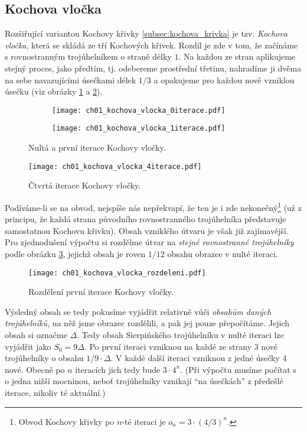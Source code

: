 \subsection{Kochova vločka}\label{subsec:kochova_vlocka}
Rozšiřující variantou Kochovy křivky \ref{subsec:kochova_krivka} je tzv. \emph{Kochova vločka}, která se skládá ze tří Kochových křivek. Rozdíl je zde v tom, že začínáme s rovnostranným trojúhelníkem o straně délky $1$. Na každou ze stran aplikujeme stejný proces, jako předtím, tj. odebereme prostřední třetinu, nahradíme ji dvěma na sebe navazujícími úsečkami délek $1/3$ a opakujeme pro každou nově vzniklou úsečku (viz obrázky \ref{fig:kochova_vlocka_dve_iterace} a \ref{fig:kochova_krivka_5iterace}).
\begin{figure}[h]
    \centering
    \begin{subfigure}{\subfigwidth}
        \centering
        \texttt{[image: ch01\_kochova\_vlocka\_0iterace.pdf]}
    \end{subfigure}
    \qquad
    \begin{subfigure}{\subfigwidth}
        \centering
        \texttt{[image: ch01\_kochova\_vlocka\_1iterace.pdf]}
    \end{subfigure}
    \caption{Nultá a první iterace Kochovy vločky.}
    \label{fig:kochova_vlocka_dve_iterace}
\end{figure}
\begin{figure}[h]
    \centering
    \texttt{[image: ch01\_kochova\_vlocka\_4iterace.pdf]}
    \caption{Čtvrtá iterace Kochovy vločky.}
    \label{fig:kochova_krivka_5iterace}
\end{figure}
Podíváme-li se na obvod, nejspíše nás nepřekvapí, že ten je i zde nekonečný\footnote{Obvod Kochovy křivky po $n$-té iteraci je $o_n=3\cdot(4/3)^{n}$.} (už z principu, že každá strana původního rovnostranného trojúhelníka představuje samostatnou Kochovu křivku).
Obsah vzniklého útvaru je však již zajímavější. Pro zjednodušení výpočtu si rozdělme útvar na \emph{stejné rovnostranné trojúhelníky} podle obrázku \ref{fig:kochova_vlocka_rozdeleni}, jejichž obsah je roven $1/12$ obsahu obrazce v nulté iteraci.
\begin{figure}[h]
    \centering
    \texttt{[image: ch01\_kochova\_vlocka\_rozdeleni.pdf]}
    \caption{Rozdělení první iterace Kochovy vločky.}
    \label{fig:kochova_vlocka_rozdeleni}
\end{figure}
Výsledný obsah se tedy pokusíme vyjádřit relativně vůči \emph{obsahům daných trojúhelníků}, na něž jsme obrazec rozdělili, a pak jej pouze přepočítáme. Jejich obsah si označme $\Delta$. Tedy obsah Sierpińského trojúhelníku v nulté iteraci lze vyjádřit jako $S_0=9\Delta$. Po první iteraci vzniknou na každé ze strany 3 nové trojúhelníky o obsahu $1/9\cdot\Delta$. V každé další iteraci vzniknou z jedné úsečky 4 nové. Obecně po $n$ iteracích jich tedy bude $3\cdot 4^{n}$. (Při výpočtu musíme počítat s o jedna nižší mocninou, neboť trojúhelníky vznikají ``na úsečkách'' z předešlé iterace, nikoliv té aktuální.)\par
